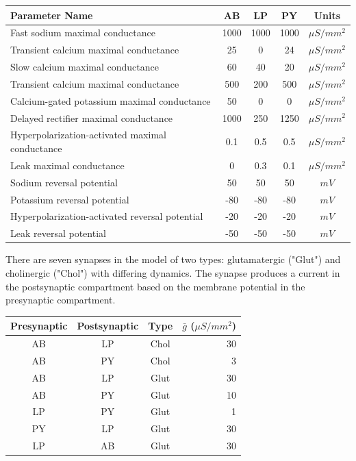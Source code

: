 \documentclass[utf8]{frontiers_suppmat} %
\begin{document}
		\begin{center}
			\begin{tabular}{|l|c|c|c|c|}
				\hline 
				\textbf{Parameter Name} & \textbf{AB} & \textbf{LP} & \textbf{PY} & \textbf{Units} \\ 
				\hline 
				Fast sodium maximal conductance & 1000 & 1000 & 1000 & $\mu S/mm^2$ \\ 
				\hline 
				Transient calcium maximal conductance & 25 & 0 & 24 & $\mu S/mm^2$ \\  
				\hline 
				Slow calcium maximal conductance & 60 & 40 & 20 & $\mu S/mm^2$ \\  
				\hline 
				Transient calcium maximal conductance & 500 & 200 & 500 & $\mu S/mm^2$ \\  
				\hline 
				Calcium-gated potassium maximal conductance & 50 & 0 & 0 & $\mu S/mm^2$ \\  
				\hline 
				Delayed rectifier maximal conductance & 1000 & 250 & 1250 & $\mu S/mm^2$ \\  
				\hline 
				Hyperpolarization-activated maximal conductance & 0.1 & 0.5 & 0.5 & $\mu S/mm^2$ \\  
				\hline 
				Leak maximal conductance & 0 & 0.3 & 0.1 & $\mu S/mm^2$ \\  
				\hline 
				Sodium reversal potential & 50 & 50 & 50 & $mV$ \\ 
				\hline 
				Potassium reversal potential & -80 & -80 & -80 & $mV$ \\ 
				\hline
				Hyperpolarization-activated reversal potential & -20 & -20 & -20 & $mV$ \\
				\hline
				Leak reversal potential & -50 & -50 & -50 & $mV$ \\
				\hline
			\end{tabular}
		\end{center}
	
		There are seven synapses in the model of two types: glutamatergic ("Glut") and cholinergic ("Chol") with differing dynamics. The synapse produces a current in the postsynaptic compartment based on the membrane potential in the presynaptic compartment. 
		
		\begin{center}
			\begin{tabular}{|c|c|c|r|}
				\hline
				\textbf{Presynaptic} & \textbf{Postsynaptic} & \textbf{Type} & $\bar{g}$ ($\mu S/mm^2$) \\
				\hline
				AB & LP & Chol & 30 \\ \hline
				AB & PY & Chol & 3 \\ \hline
				AB & LP & Glut & 30 \\ \hline
				AB & PY & Glut & 10 \\ \hline
				LP & PY & Glut & 1 \\ \hline
				PY & LP & Glut & 30 \\ \hline
				LP & AB & Glut & 30 \\ \hline
			\end{tabular}
		\end{center}
	
\end{document}
